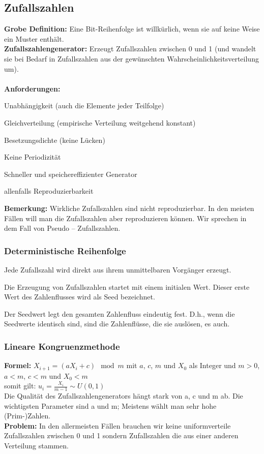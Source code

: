 \subsection{Zufallszahlen}
\textbf{Grobe Definition:} Eine Bit-Reihenfolge ist willkürlich, wenn sie auf keine Weise ein Muster enthält. \\
\textbf{Zufallszahlengenerator:} Erzeugt Zufallszahlen zwischen 0 und 1 (und wandelt sie bei Bedarf in Zufallszahlen aus der gewünschten Wahrscheinlichkeitsverteilung um). \\ \\
\textbf{Anforderungen:}
\begin{multicols}{2}
	\begin{compactitem}
		\item Unabhängigkeit (auch die Elemente jeder Teilfolge)
		\item Gleichverteilung (empirische Verteilung weitgehend konstant)
		\item Besetzungsdichte (keine Lücken)
		\item Keine Periodizität
		\item Schneller und speichereffizienter Generator
		\item allenfalls Reproduzierbarkeit
	\end{compactitem}
\end{multicols}	
\textbf{Bemerkung:} Wirkliche Zufallszahlen sind nicht reproduzierbar. In den meisten Fällen will man die Zufallszahlen aber reproduzieren können. Wir sprechen in dem Fall von Pseudo – Zufallszahlen.
	
\subsubsection{Deterministische Reihenfolge}
\begin{compactitem}
	\item Jede Zufallszahl wird direkt aus ihrem unmittelbaren Vorgänger erzeugt.
	\item Die Erzeugung von Zufallszahlen startet mit einem initialen Wert. Dieser erste Wert des Zahlenflusses wird als Seed bezeichnet.
	\item Der Seedwert legt den gesamten Zahlenfluss eindeutig fest. D.h., wenn die Seedwerte identisch sind, sind die Zahlenflüsse, die sie auslösen, es auch.
\end{compactitem}

\subsubsection{Lineare Kongruenzmethode}
\textbf{Formel:} $X_{i+1}=(aX_i+c)\mod m$ mit $a$, $c$, $m$ und $X_0$ als Integer und $m > 0$, $a < m$, $c < m$ und $X_0 < m$ \\
somit gilt: $u_i = \frac{X_i}{m-1}\sim U(0, 1)$ \\
Die Qualität des Zufallszahlengenerators hängt stark von a, c und m ab. Die wichtigsten Parameter sind a und m; Meistens wählt man sehr hohe (Prim-)Zahlen. \\
\textbf{Problem:} In den allermeisten Fällen brauchen wir keine uniformverteile Zufallszahlen zwischen 0 und 1 sondern Zufallszahlen die aus einer anderen Verteilung stammen.

